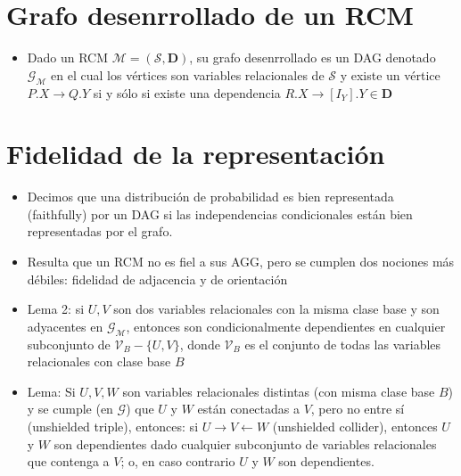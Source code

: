 \documentclass[11pt]{article}
\theoremstyle{plain}
\begin{document}
\section{Grafo desenrrollado de un RCM}
\begin{itemize}
\item Dado un RCM $\mathcal{M}=(\mathcal{S},\mathbf{D})$, su grafo desenrrollado es un DAG denotado $\mathcal{G}_\mathcal{M}$ en el cual los vértices son variables relacionales de $\mathcal{S}$ y existe un vértice $P.X \to Q.Y$ si y sólo si existe una dependencia $R.X \to [I_Y].Y \in \mathbf{D}$
\end{itemize}
\section{Fidelidad de la representación}
\begin{itemize}
\item Decimos que una distribución de probabilidad es bien representada (faithfully) por un DAG si las independencias condicionales están bien representadas por el grafo. 
\item Resulta que un RCM no es fiel a sus AGG, pero se cumplen dos nociones más débiles: fidelidad de adjacencia y de orientación
\item Lema 2: si $U,V$ son dos variables relacionales con la misma clase base y son adyacentes en $\mathcal{G}_\mathcal{M}$, entonces son condicionalmente dependientes en cualquier subconjunto de $\mathcal{V}_B - \{U,V\}$, donde $\mathcal{V}_B$ es el conjunto de todas las variables relacionales con clase base $B$
\item Lema: Si $U,V,W$ son variables relacionales distintas (con misma clase base $B$) y se cumple (en $\mathcal{G}$) que $U$ y $W$ están conectadas a $V$, pero no entre sí (unshielded triple), entonces: si $U \to V \leftarrow W$ (unshielded collider), entonces $U$ y $W$ son dependientes dado cualquier subconjunto de variables relacionales que contenga a $V$; o, en caso contrario $U$ y $W$ son dependientes.
\end{itemize}
\end{document}
